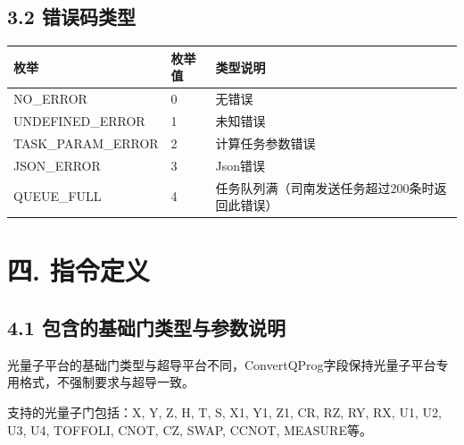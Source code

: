\documentclass{ctexart}
\begin{document}
\subsection{3.2 错误码类型}

\begin{longtable}{|l|l|l|}
\hline
\textbf{\textbf{枚举}} & \textbf{\textbf{枚举值}} & \textbf{\textbf{类型说明}} \\
\hline
NO_ERROR & 0 & 无错误 \\
UNDEFINED_ERROR & 1 & 未知错误 \\
TASK_PARAM_ERROR & 2 & 计算任务参数错误 \\
JSON_ERROR & 3 & Json错误 \\
QUEUE_FULL & 4 & 任务队列满（司南发送任务超过200条时返回此错误） \\
\hline
\end{longtable}

\section{四. 指令定义}

\subsection{4.1 包含的基础门类型与参数说明}

光量子平台的基础门类型与超导平台不同，ConvertQProg字段保持光量子平台专用格式，不强制要求与超导一致。

支持的光量子门包括：X, Y, Z, H, T, S, X1, Y1, Z1, CR, RZ, RY, RX, U1, U2, U3, U4, TOFFOLI, CNOT, CZ, SWAP, CCNOT, MEASURE等。
\end{document}
